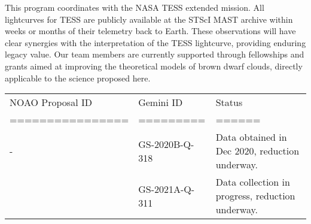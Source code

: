 \documentclass[11pt]{article}
\begin{document}
{%
%
%
%

\otherfacilities
This program coordinates with the NASA TESS extended mission.  All lightcurves for TESS are publicly available at the STScI MAST archive within weeks or months of their telemetry back to Earth.  These observations will have clear synergies with the interpretation of the TESS lightcurve, providing enduring legacy value.  Our team members are currently supported through fellowships and grants aimed at improving the theoretical models of brown dwarf clouds, directly applicable to the science proposed here.  

%
%
\thepast
\begin{tabular}{lll}
NOAO Proposal ID & Gemini ID & Status \\
================ & ========= & ====== \\
- & GS-2020B-Q-318  & Data obtained in Dec 2020, reduction underway. \\
 & GS-2021A-Q-311 & Data collection in progress, reduction underway. \\
\end{tabular}
 
}
\end{document}
